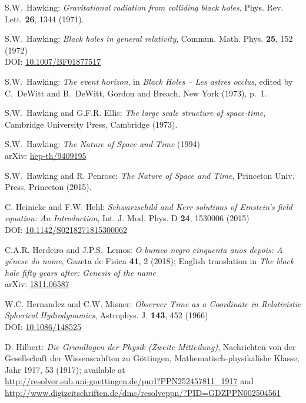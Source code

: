 \begin{thebibliography}{123}
S.W.~Hawking: {\em Gravitational radiation from colliding black holes},
Phys. Rev. Lett. {\bf 26}, 1344 (1971).

S.W.~Hawking: {\em Black holes in general relativity},
Commun. Math. Phys. {\bf 25}, 152 (1972)\\
DOI: \href{https://doi.org/10.1007/BF01877517}{10.1007/BF01877517}

S.W.~Hawking: {\em The event horizon},
in {\em Black Holes -- Les astres occlus}, edited by C.~DeWitt and B.~DeWitt,
Gordon and Breach, New York (1973), p.~1.

S.W.~Hawking and G.F.R. Ellis: {\em The large scale structure of
space-time},
Cambridge University Press, Cambridge (1973).

S.W.~Hawking: {\em The Nature of Space and Time} (1994)\\
arXiv: \href{https://arxiv.org/abs/hep-th/9409195}{hep-th/9409195}

S.W.~Hawking and R. Penrose: {\em The Nature of Space and Time},
Princeton Univ. Press, Princeton (2015).

C. Heinicke and F.W. Hehl:
{\em Schwarzschild and Kerr solutions of Einstein's field equation: An Introduction},
Int. J. Mod. Phys. D {\bf 24}, 1530006 (2015)\\
DOI: \href{https://doi.org/10.1142/S0218271815300062}{10.1142/S0218271815300062}

C.A.R. Herdeiro and J.P.S.~Lemos:
\emph{O buraco negro cinquenta anos depois:
A génese do nome},
Gazeta de Fisica {\bf 41}, 2 (2018); English translation in
\emph{The black hole fifty years after: Genesis of the name}\\
arXiv: \href{https://arxiv.org/abs/1811.06587}{1811.06587}

W.C. Hernandez and C.W. Misner:
{\em Observer Time as a Coordinate in Relativistic Spherical Hydrodynamics},
Astrophys. J. {\bf 143}, 452 (1966) \\
DOI: \href{https://doi.org/10.1086/148525}{10.1086/148525}

D. Hilbert:
{\em Die Grundlagen der Physik (Zweite Mitteilung)},
Nachrichten von der Gesellschaft der Wissenscahften zu Göttingen,
Mathematisch-physikalishe Klasse, Jahr 1917, 53 (1917);
available at\\
\url{http://resolver.sub.uni-goettingen.de/purl?PPN252457811_1917} and\\
\url{http://www.digizeitschriften.de/dms/resolveppn/?PID=GDZPPN002504561}


\end{thebibliography}
